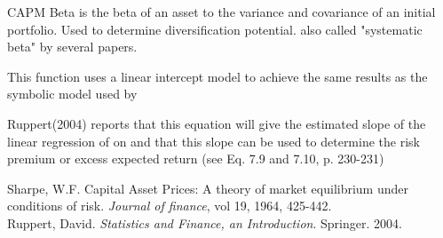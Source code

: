 \documentclass[12pt,letterpaper,english]{article}
\begin{document}
\begin{Description}\relax
CAPM Beta is the beta of an asset to the variance and covariance of an initial portfolio.  Used to determine diversification potential. also called "systematic beta" by several papers.

This function uses a linear intercept model to achieve the same results as the symbolic model used by 
\end{Description}
\begin{Details}\relax
{}

Ruppert(2004) reports that this equation will give the estimated slope of the linear regression of  on  and that this slope can be used to determine the risk premium or excess expected return (see Eq. 7.9 and 7.10, p. 230-231)
\end{Details}
\begin{References}\relax
Sharpe, W.F. Capital Asset Prices: A theory of market equilibrium under conditions of risk. \emph{Journal of finance}, vol 19, 1964, 425-442. \\
Ruppert, David. \emph{Statistics and Finance, an Introduction}. Springer. 2004. \\
\end{References}

\end{document}

